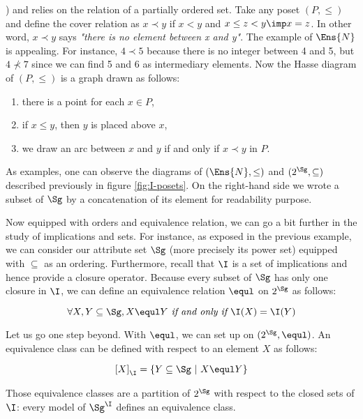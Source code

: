 \cite{davey_introduction_2002}) and relies on the  relation of
a partially ordered set. Take any poset $(P, \leq)$ and define the cover 
relation as $x \prec y$ if $x < y$ and $x \leq z < y \imp x = z$. In other 
word, $x \prec y$ says \textit{"there is no element between x and y"}. The
example of $\Ens{N}$ is appealing. For instance, $4 \prec 5$ because there is
no integer between 4 and 5, but $4 \nprec 7$ since we can find 5 and 6 as 
intermediary elements. Now the Hasse diagram of $(P, \leq)$ is a graph drawn as 
follows:
\begin{enumerate}
	\item there is a point for each $x \in P$,
	\item if $x \leq y$, then $y$ is placed above $x$,
	\item we draw an arc between $x$ and $y$ if and only if $x \prec y$ in $P$.
\end{enumerate}
As examples, one can observe the diagrams of $(\Ens{N}, \leq)$ and $(2^{\Sg}, 
\subseteq)$ described previously in figure \ref{fig:I-posets}. On the right-hand
side we wrote a subset of $\Sg$ by a concatenation of its element for 
readability purpose.


\begin{figure}[ht]
	
\end{figure}

\vspace{1.2em}

Now equipped with orders and equivalence relation, we can go a bit further in
the study of implications and sets. For instance, as exposed in the previous 
example, we can consider our attribute set $\Sg$ (more precisely its power set)
equipped with $\subseteq$ as an ordering. Furthermore, recall that $\I$ is
a set of implications and hence provide a closure operator. Because every 
subset of $\Sg$ has only one closure in $\I$, we can define an equivalence 
relation $\equl$ on $2^{\Sg}$ as follows:

	\[ \forall X, Y \subseteq \Sg, X \equl Y \textit{ if and only if }
	\I(X) = \I(Y) \]

\noindent Let us go one step beyond. With $\equl$, we can set up 
 on $(2^{\Sg}, \equl)$. An equivalence class can be 
defined with respect to an element $X$ as follows:

	\[ \left[ X \right]_{\I} = \{ Y \subseteq \Sg \ | \ X \equl Y \}  \]
	
\noindent Those equivalence classes are a partition of $2^{\Sg}$ with respect
to the closed sets of $\I$: every model of $\Sg^{\I}$ defines an 
equivalence class. 

